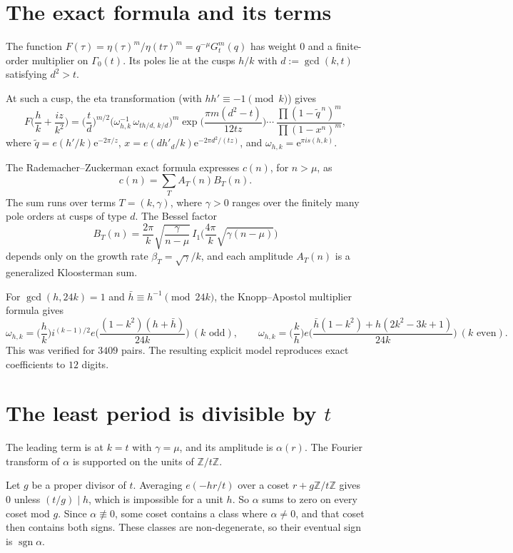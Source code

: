 \documentclass[11pt]{amsart}
\newcommand{\e}{\mathrm e}\newcommand{\Z}{\mathbb Z}
\begin{document}
\section{The exact formula and its terms}
The function $F(\tau)=\eta(\tau)^m/\eta(t\tau)^m=q^{-\mu}G_t^m(q)$ has weight $0$ and a finite-order multiplier on $\Gamma_0(t)$. Its poles lie at the cusps $h/k$ with $d:=\gcd(k,t)$ satisfying $d^2>t$.

At such a cusp, the eta transformation (with $hh'\equiv-1\pmod k$) gives
\[
F\Big(\frac hk+\frac{iz}{k^2}\Big)=\Big(\frac td\Big)^{m/2}\big(\omega_{h,k}^{-1}\,\omega_{th/d,\,k/d}\big)^m\exp\Big(\frac{\pi m(d^2-t)}{12tz}\Big)\cdots\ \frac{\prod(1-\tilde q^{\,n})^m}{\prod(1-x^n)^m},
\]
where $\tilde q=e(h'/k)\e^{-2\pi/z}$, $x=e(dh'_d/k)\e^{-2\pi d^2/(tz)}$, and $\omega_{h,k}=\e^{\pi is(h,k)}$.

The Rademacher--Zuckerman exact formula \cite{Z,BO} expresses $c(n)$, for $n>\mu$, as
\[
c(n)=\sum_T A_T(n)B_T(n).
\]
The sum runs over terms $T=(k,\gamma)$, where $\gamma>0$ ranges over the finitely many pole orders at cusps of type $d$. The Bessel factor
\[
B_T(n)=\frac{2\pi}{k}\sqrt{\frac\gamma{n-\mu}}\,I_1\Big(\frac{4\pi}{k}\sqrt{\gamma(n-\mu)}\Big)
\]
depends only on the growth rate $\beta_T=\sqrt\gamma/k$, and each amplitude $A_T(n)$ is a generalized Kloosterman sum.

For $\gcd(h,24k)=1$ and $\bar h\equiv h^{-1}\pmod{24k}$, the Knopp--Apostol multiplier formula gives
\[
\omega_{h,k}=\Big(\frac hk\Big)i^{(k-1)/2}e\Big(\frac{(1-k^2)(h+\bar h)}{24k}\Big)\ (k\text{ odd}),\qquad
\omega_{h,k}=\Big(\frac kh\Big)e\Big(\frac{\bar h(1-k^2)+h(2k^2-3k+1)}{24k}\Big)\ (k\text{ even}).
\]
This was verified for $3409$ pairs. The resulting explicit model reproduces exact coefficients to $12$ digits.

\section{The least period is divisible by $t$}
The leading term is at $k=t$ with $\gamma=\mu$, and its amplitude is $\alpha(r)$. The Fourier transform of $\alpha$ is supported on the units of $\Z/t\Z$.

Let $g$ be a proper divisor of $t$. Averaging $e(-hr/t)$ over a coset $r+g\Z/t\Z$ gives $0$ unless $(t/g)\mid h$, which is impossible for a unit $h$. So $\alpha$ sums to zero on every coset mod $g$. Since $\alpha\not\equiv0$, some coset contains a class where $\alpha\neq0$, and that coset then contains both signs. These classes are non-degenerate, so their eventual sign is $\operatorname{sgn}\alpha$.
\end{document}
